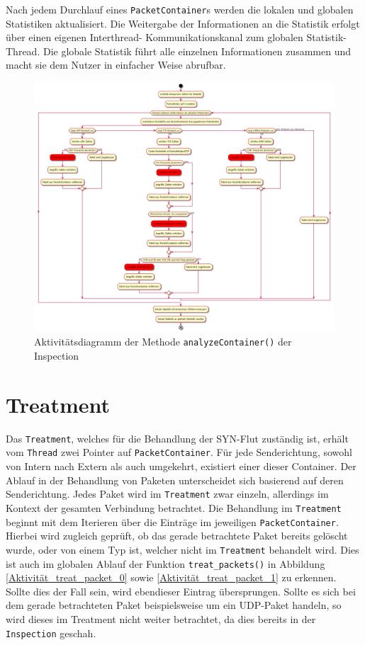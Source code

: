\documentclass[../review_3.tex]{subfiles}
\begin{document}
Nach jedem Durchlauf eines \texttt{PacketContainer}s werden die lokalen und globalen Statistiken aktualisiert. Die Weitergabe der Informationen an die Statistik erfolgt über einen eigenen Interthread- Kommunikationskanal zum globalen Statistik-Thread. Die globale Statistik führt alle einzelnen Informationen zusammen und macht sie dem Nutzer in einfacher Weise abrufbar.
\begin{figure}[h]
    \centering
    \includegraphics[angle=270, width=\linewidth]{img/inspection_ablauf.png}
    \caption{Aktivitätsdiagramm der Methode \texttt{analyzeContainer()} der Inspection}
    \label{inspection_activity}
\end{figure}

\section{Treatment}
Das \texttt{Treatment}, welches für die Behandlung der SYN-Flut zuständig ist, erhält vom \texttt{Thread} zwei Pointer auf \texttt{PacketContainer}. Für jede Senderichtung, sowohl von Intern nach Extern als auch umgekehrt, existiert einer dieser Container. Der Ablauf in der Behandlung von Paketen unterscheidet sich basierend auf deren Senderichtung. Jedes Paket wird im \texttt{Treatment} zwar einzeln, allerdings im Kontext der gesamten Verbindung betrachtet. Die Behandlung im \texttt{Treatment} beginnt mit dem Iterieren über die Einträge im jeweiligen \texttt{PacketContainer}. Hierbei wird zugleich geprüft, ob das gerade betrachtete Paket bereits gelöscht wurde, oder von einem Typ ist, welcher nicht im \texttt{Treatment} behandelt wird. Dies ist auch im globalen Ablauf der Funktion \texttt{treat\_packets()} in Abbildung \ref{Aktivität_treat_packet_0} sowie \ref{Aktivität_treat_packet_1} zu erkennen. Sollte dies der Fall sein, wird ebendieser Eintrag übersprungen. Sollte es sich bei dem gerade betrachteten Paket beispielsweise um ein UDP-Paket handeln, so wird dieses im Treatment nicht weiter betrachtet, da dies bereits in der \texttt{Inspection} geschah.
\end{document}
